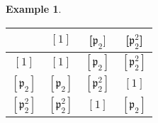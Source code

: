 \documentclass[11pt,a4paper]{report}
\theoremstyle{plain}
\theoremstyle{definition}
\newtheorem{exmp}[subsection]{Example}
\theoremstyle{definition}
\def\gothp{\mathfrak{p}}
\begin{document}
\begin{exmp}
	
	
	
	
	\begin{center}
		\begin{tabular} {|c| c c c |}
			\hline
			&$[1]$&[$\gothp_2]$&[$\gothp_2^2$]\\
			\hline
			$[1]$&$[1]$&$[\gothp_2]$&$[\gothp_2^2]$\\
			$[\gothp_2]$&$[\gothp_2] $& $[\gothp_2^2]$&$[1]$\\
			$[\gothp_2^2]$&$[\gothp_2^2]$&$[1]$&$[\gothp_2]$\\
			\hline
		\end{tabular}
	\end{center}
	
	
	
\end{exmp}
\end{document}
